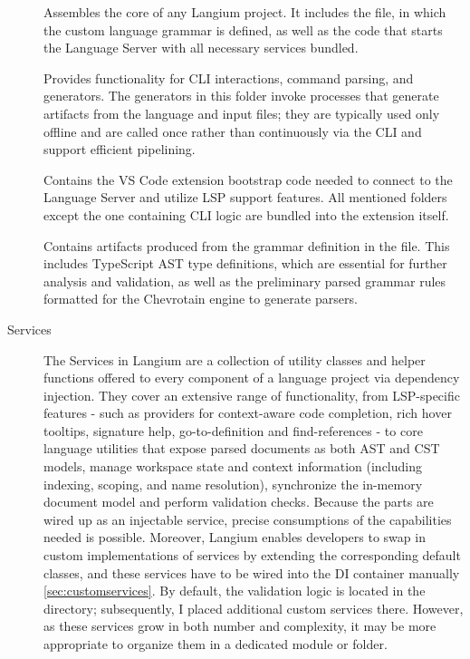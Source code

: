 \begin{description}
  \item[] Assembles the core of any Langium project. It includes the  file, in which the custom language grammar is defined, as well as
    the code that starts the Language Server with all necessary services bundled.
  \item[] Provides functionality for CLI interactions, command parsing, and generators. The generators in this folder invoke processes that generate artifacts
    from the language and input files; they are typically used only offline and are called once rather than continuously via the CLI and support efficient pipelining.
  \item[] Contains the VS Code extension bootstrap code needed to connect to the Language Server and utilize LSP support features.
    All mentioned folders except the one containing CLI logic are bundled into the extension itself.
  \item[] Contains artifacts produced from the grammar definition in the  file. This includes TypeScript AST type definitions,
    which are essential for further analysis and validation, as well as the preliminary parsed grammar rules formatted for the Chevrotain engine to generate parsers.
  \item[\textsf{Services}] The Services in Langium are a collection of utility classes and helper functions offered to every component of a language project via
    dependency injection. They cover an extensive range of functionality, from LSP-specific features - such as providers for context-aware code completion, rich hover
    tooltips, signature help, go-to-definition and find-references - to core language utilities that expose parsed documents as both AST and CST models, manage workspace
    state and context information (including indexing, scoping, and name resolution), synchronize the in-memory document model and perform validation checks.
    Because the parts are wired up as an injectable service, precise consumptions of the capabilities needed is possible. Moreover, Langium enables developers to swap in
    custom implementations of services by extending the corresponding default classes, and these services have to be wired into the DI container manually \ref{sec:customservices}.
    By default, the validation logic is located in the  directory; subsequently, I placed additional custom services there.
    However, as these services grow in both number and complexity, it may be more appropriate to organize them in a dedicated module or folder.
\end{description}

